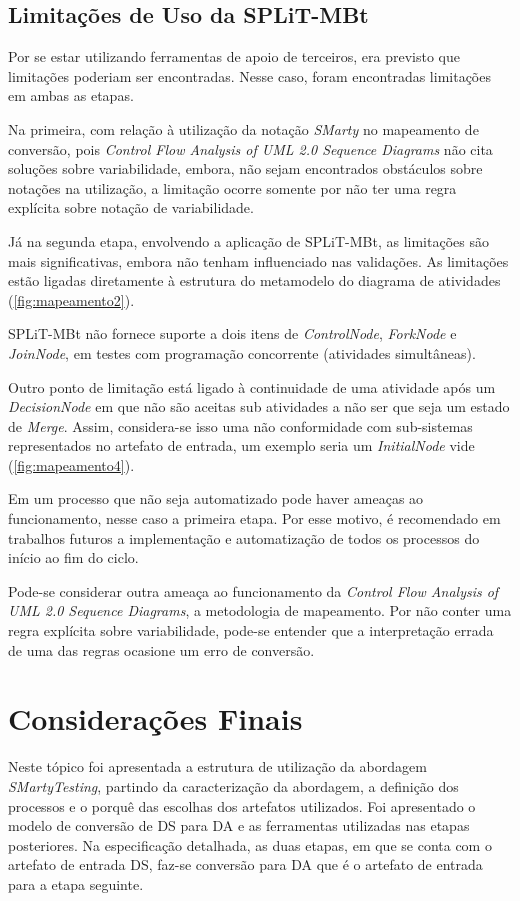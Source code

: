 \subsection{Limitações de Uso da SPLiT-MBt}
\label{cap3subsec:limitacoes}

Por se estar utilizando ferramentas de apoio de terceiros, era previsto que limitações poderiam ser encontradas. Nesse caso, foram encontradas limitações em ambas as etapas.

Na primeira, com relação à utilização da notação \textit{SMarty} no mapeamento de conversão, pois \textit{Control Flow Analysis of UML 2.0 Sequence Diagrams} não cita soluções sobre variabilidade, embora, não sejam encontrados obstáculos sobre notações na utilização, a limitação ocorre somente por não ter uma regra explícita sobre notação de variabilidade.

Já na segunda etapa, envolvendo a aplicação de SPLiT-MBt, as limitações são mais significativas, embora não tenham influenciado nas validações. As limitações estão ligadas diretamente à estrutura do metamodelo do diagrama de atividades (\ref{fig:mapeamento2}).

SPLiT-MBt não fornece suporte a dois itens de \textit{ControlNode}, \textit{ForkNode} e \textit{JoinNode}, em testes com programação concorrente (atividades simultâneas). 

Outro ponto de limitação está ligado à continuidade de uma atividade após um \textit{DecisionNode} em que não são aceitas sub atividades a não ser que seja um estado de \textit{Merge}. Assim, considera-se isso uma não conformidade com sub-sistemas representados no artefato de entrada, um exemplo seria um \textit{InitialNode} vide (\ref{fig:mapeamento4}).  

Em um processo que não seja automatizado pode haver ameaças ao funcionamento, nesse caso a primeira etapa. Por esse motivo, é recomendado em trabalhos futuros a implementação e automatização de todos os processos do início ao fim do ciclo.

Pode-se considerar outra ameaça ao funcionamento da \textit{Control Flow Analysis of UML 2.0 Sequence Diagrams}, a metodologia de mapeamento. Por  não conter uma regra explícita sobre variabilidade, pode-se entender que a interpretação errada de uma das regras ocasione um erro de conversão. 


\section{Considerações Finais}
\label{cap3sec:consideracoes_smarty}
Neste tópico foi apresentada a estrutura de utilização da abordagem \textit{SMartyTesting}, partindo da caracterização da abordagem, a definição dos processos e o porquê das escolhas dos artefatos utilizados. Foi apresentado o modelo de conversão de DS para DA e as ferramentas utilizadas nas etapas posteriores. Na especificação detalhada, as duas etapas, em que se conta com o artefato de entrada DS, faz-se conversão para DA que é o artefato de entrada para a etapa seguinte. 